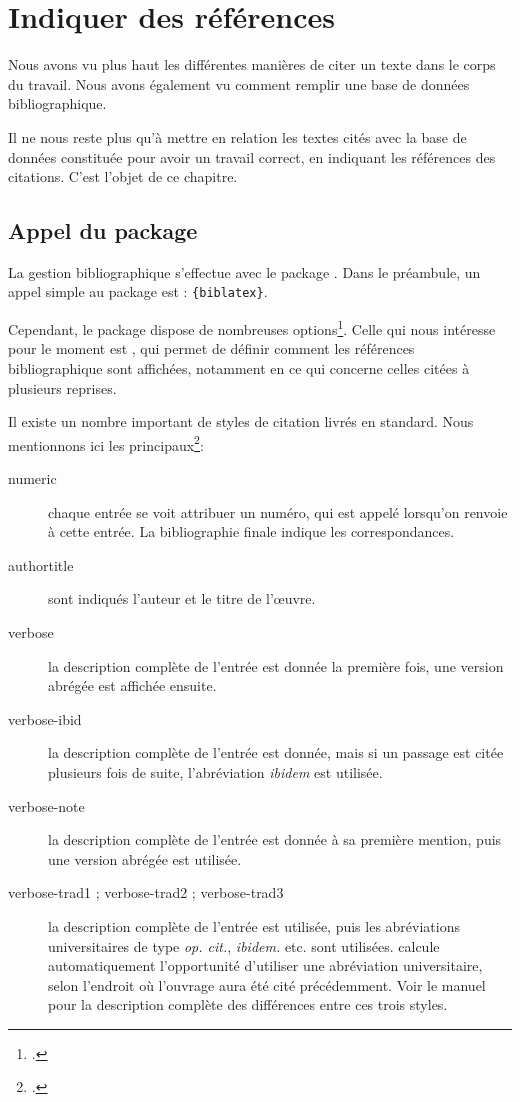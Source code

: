 \chapter{Indiquer des références}

\begin{prealable}
Nous avons vu plus haut les différentes manières de citer un texte dans  le corps du travail. Nous avons également vu comment remplir une base de données bibliographique.

Il ne nous reste plus qu'à mettre en relation les textes cités avec la base de données constituée pour avoir un travail correct, en indiquant les références des citations. C'est l'objet de ce chapitre.

\end{prealable}


\section[Appel du package]{Appel du package }

La gestion bibliographique s'effectue avec le package . Dans le préambule, un appel simple au package est :
\verb|{biblatex}|.


Cependant, le package dispose de nombreuses options\footcite{biblatex_options}. Celle qui nous intéresse pour le moment est , qui permet de définir comment les références bibliographique sont affichées, notamment en ce qui concerne celles citées à plusieurs reprises.

Il existe un nombre important de styles de citation livrés en standard. Nous mentionnons ici les principaux\footcite[Se reporter pour plus de détails à][]{biblatex_style}:
\begin{description}
\item[numeric] chaque entrée se voit attribuer un numéro, qui est appelé lorsqu'on renvoie à cette entrée. La bibliographie finale indique les correspondances.
\item[authortitle] sont indiqués l'auteur et le titre de l'œuvre.
\item[verbose] la description complète de l'entrée est donnée la première fois, une version abrégée est affichée ensuite.
\item[verbose-ibid] la description complète de l'entrée est donnée, mais si un passage est citée plusieurs fois de suite, l'abréviation \emph{ibidem} est utilisée.
\item[verbose-note] la description complète de l'entrée est donnée à sa première mention, puis une version abrégée est utilisée.
\item[verbose-trad1 ; verbose-trad2 ; verbose-trad3] la description complète de l'entrée est utilisée, puis les abréviations universitaires de type \emph{op. cit.}, \emph{ibidem.} etc. sont utilisées.  calcule automatiquement l'opportunité d'utiliser une abréviation universitaire, selon l'endroit où l'ouvrage aura été cité précédemment. Voir le manuel pour la description complète des différences entre ces trois styles.
\end{description}

